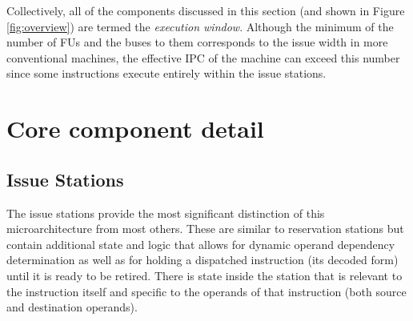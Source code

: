 \documentclass[10pt,twocolumn,dvips]{article}
\begin{document}
Collectively, all of the components discussed in this section
(and shown in 
Figure \ref{fig:overview}) are termed the \textit{execution window}.
Although the minimum of the number of FUs and the buses to them
corresponds to the issue width in more conventional machines,
the effective IPC of the machine can exceed this number since
some instructions
execute entirely within the issue stations.
%
\vspace{-0.15in}
\section{Core component detail}
%
\subsection{Issue Stations}
%
The issue stations provide the most significant distinction of this
microarchitecture from most others.  
These are similar to reservation stations
but contain additional state and logic that allows
for dynamic operand dependency determination as well as
for holding a dispatched instruction (its decoded form) 
until it is ready to be retired.  
There is state inside the station that is relevant to
the instruction itself and specific
to the operands of that instruction (both source and
destination operands).
\end{document}
